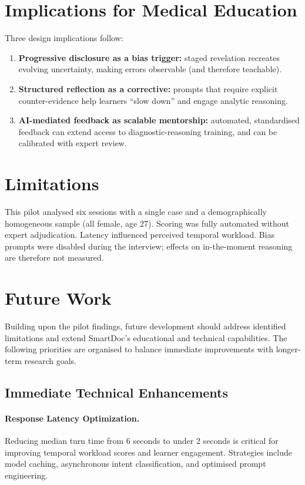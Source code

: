 \section{Implications for Medical Education}
Three design implications follow:
\begin{enumerate}
  \item \textbf{Progressive disclosure as a bias trigger:} staged revelation recreates
  evolving uncertainty, making errors observable (and therefore teachable).
  \item \textbf{Structured reflection as a corrective:} prompts that require explicit
  counter-evidence help learners “slow down” and engage analytic reasoning.
  \item \textbf{AI-mediated feedback as scalable mentorship:} automated, standardised
  feedback can extend access to diagnostic-reasoning training, and can be calibrated with
  expert review.
\end{enumerate}

\section{Limitations}
This pilot analysed six sessions with a single case and a demographically homogeneous
sample (all female, age 27). Scoring was fully automated without expert adjudication.
Latency influenced perceived temporal workload. Bias prompts were disabled during the
interview; effects on in-the-moment reasoning are therefore not measured.

\section{Future Work}

Building upon the pilot findings, future development should address identified limitations
and extend SmartDoc's educational and technical capabilities. The following priorities are
organised to balance immediate improvements with longer-term research goals.

\subsection{Immediate Technical Enhancements}

\paragraph{Response Latency Optimization.}
Reducing median turn time from 6 seconds to under 2 seconds is critical for improving
temporal workload scores and learner engagement. Strategies include model caching,
asynchronous intent classification, and optimised prompt engineering.

